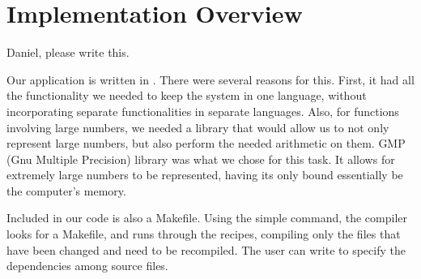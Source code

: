 \section{Implementation Overview}

Daniel, please write this.


Our application is written in . There were several reasons for this.
First, it had all the functionality we needed to keep the system in one language,
 without incorporating separate functionalities in separate languages. Also, for
 functions involving large numbers, we needed a library that would allow us to not
 only represent large numbers, but also perform the needed arithmetic on them.
 GMP (Gnu Multiple Precision) library was what we chose for this task. It allows
 for extremely large numbers to be represented, having its only bound essentially
 be the computer's memory.

Included in our code is also a Makefile. Using the simple  command,
the compiler looks for a Makefile, and runs through the recipes, compiling only
the files that have been changed and need to be recompiled. The user can write
 to specify the dependencies among source files.  

